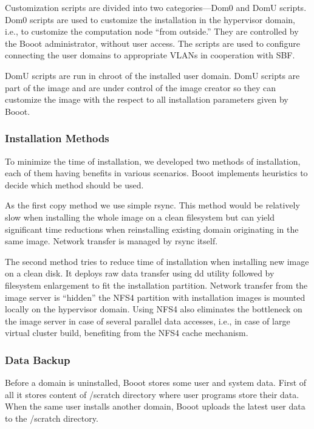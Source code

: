 \documentclass[a4paper]{article}
\begin{document}
Customization scripts are divided into two categories---Dom0 and DomU
scripts. Dom0 scripts are used to customize the installation in the
hypervisor domain, i.e., to customize the computation node ``from outside.''
They are controlled by the Booot administrator, without user access. The
scripts are used to configure connecting the user domains to appropriate
VLANs in cooperation with SBF.

DomU scripts are run in chroot of the installed user domain. DomU scripts
are part of the image and are under control of the image creator so they can 
customize the image with the respect to all installation parameters given by 
Booot.

\subsubsection{Installation Methods}

To minimize the time of installation, we developed two methods of
installation, each of them having benefits in various scenarios. Booot
implements heuristics to decide which method should be used.

As the first copy method we use simple rsync. This method would be relatively slow when installing the whole image on a clean filesystem but can yield significant time reductions when reinstalling existing domain originating in the same image. Network transfer is managed by rsync itself.

The second method tries to reduce time of installation when installing new image on a clean disk. It deploys raw data transfer using dd
utility followed by filesystem enlargement to fit the installation
partition. Network transfer from the image server is ``hidden'' the NFS4
partition with installation images is mounted locally on the hypervisor
domain. Using NFS4 also eliminates the bottleneck on the image server in
case of several parallel data accesses, i.e., in case of large virtual
cluster build, benefiting from the NFS4 cache mechanism.

\subsubsection{Data Backup}

Before a domain is uninstalled, Booot stores some user and system data.
First of all it stores content of /scratch directory where user programs
store their data. When the same user installs another domain, Booot uploads
the  latest user data to the /scratch directory.
\end{document}
